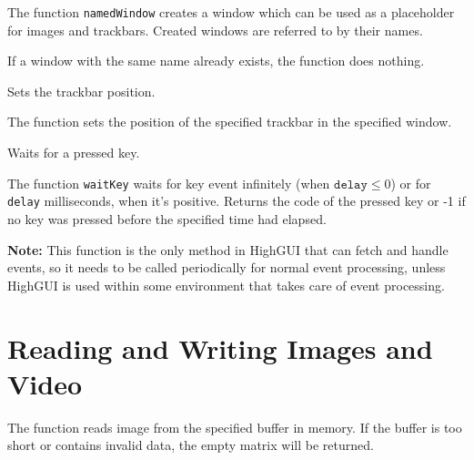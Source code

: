The function \texttt{namedWindow} creates a window which can be used as a placeholder for images and trackbars. Created windows are referred to by their names.

If a window with the same name already exists, the function does nothing.

Sets the trackbar position.

\begin{description}
\end{description}

The function sets the position of the specified trackbar in the specified window.


Waits for a pressed key.

\begin{description}
\end{description}

The function \texttt{waitKey} waits for key event infinitely (when $\texttt{delay}\leq 0$) or for \texttt{delay} milliseconds, when it's positive. Returns the code of the pressed key or -1 if no key was pressed before the specified time had elapsed.

\textbf{Note:} This function is the only method in HighGUI that can fetch and handle events, so it needs to be called periodically for normal event processing, unless HighGUI is used within some environment that takes care of event processing.

\section{Reading and Writing Images and Video}


\begin{description}
\end{description}

The function reads image from the specified buffer in memory.
If the buffer is too short or contains invalid data, the empty matrix will be returned.

